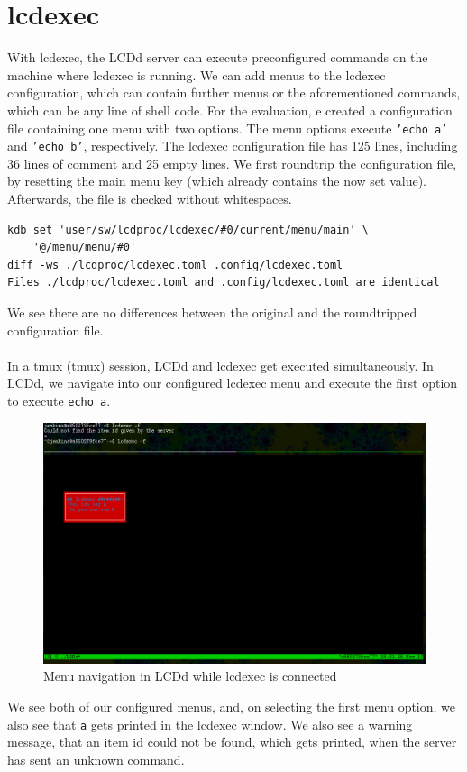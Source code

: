\documentclass[12pt]{report}
\begin{document}
\section{lcdexec}
With lcdexec, the LCDd server can execute preconfigured commands on the machine where lcdexec is running.
We can add menus to the lcdexec configuration, which can contain further menus or the aforementioned commands, which can be any line of shell code.
For the evaluation, e created a configuration file containing one menu with two options.
The menu options execute \texttt{'echo a'} and \texttt{'echo b'}, respectively.
The lcdexec configuration file has 125 lines, including 36 lines of comment and 25 empty lines.
We first roundtrip the configuration file, by resetting the main menu key (which already contains the now set value).
Afterwards, the file is checked without whitespaces.
{\small
\begin{verbatim}
kdb set 'user/sw/lcdproc/lcdexec/#0/current/menu/main' \
	'@/menu/menu/#0'
diff -ws ./lcdproc/lcdexec.toml .config/lcdexec.toml 
Files ./lcdproc/lcdexec.toml and .config/lcdexec.toml are identical
\end{verbatim}
}
We see there are no differences between the original and the roundtripped configuration file.
\\\\
In a \acrshort{tmux} (\acrlong{tmux}) session, LCDd and lcdexec get executed simultaneously.
In LCDd, we navigate into our configured lcdexec menu and execute the first option to execute \texttt{echo a}.
\FloatBarrier
\begin{figure}[h!]
	\centering
		\includegraphics[width=\linewidth]{lcdexec_menu.png}
  \caption{Menu navigation in LCDd while lcdexec is connected}
\label{fig:lcdexec}
\end{figure}
\FloatBarrier
We see both of our configured menus, and, on selecting the first menu option, we also see that \texttt{a} gets printed in the lcdexec window.
We also see a warning message, that an item id could not be found, which gets printed, when the server has sent an unknown command.
\end{document}
